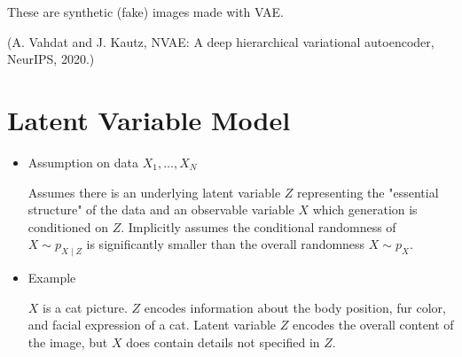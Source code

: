 \documentclass{report}
\begin{document}
These are synthetic (fake) images made with VAE.

(A. Vahdat and J. Kautz, NVAE: A deep hierarchical variational autoencoder, NeurIPS, 2020.)

\section{Latent Variable Model}

\begin{itemize}
    \item
    Assumption on data $X_{1}, \ldots, X_{N}$

    Assumes there is an underlying latent variable $Z$ representing the "essential structure" of the data and an observable variable $X$ which generation is conditioned on $Z$. Implicitly assumes the conditional randomness of $X \sim p_{X \mid Z}$ is significantly smaller than the overall randomness $X \sim p_{X}$.
    \item
    Example

    $X$ is a cat picture. $Z$ encodes information about the body position, fur color, and facial expression of a cat. Latent variable $Z$ encodes the overall content of the image, but $X$ does contain details not specified in $Z$.
\end{itemize}
\end{document}
